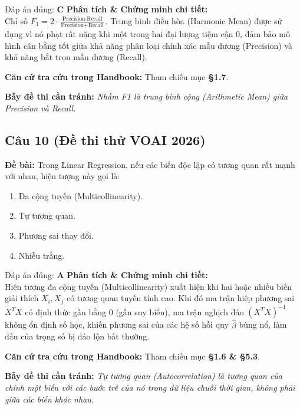 \documentclass[10pt,a4paper]{article}
\begin{document}
\begin{solbox}{Đáp án đúng: \textbf{C}}
\textbf{Phân tích \& Chứng minh chi tiết:} \\
Chỉ số $F_1 = 2 \cdot \frac{\text{Precision} \cdot \text{Recall}}{\text{Precision} + \text{Recall}}$. Trung bình điều hòa (Harmonic Mean) được sử dụng vì nó phạt rất nặng khi một trong hai đại lượng tiệm cận 0, đảm bảo mô hình cân bằng tốt giữa khả năng phân loại chính xác mẫu dương (Precision) và khả năng bắt trọn mẫu dương (Recall).

\vspace{0.4em}
\textbf{Căn cứ tra cứu trong Handbook:} Tham chiếu mục \textbf{§1.7}.

\vspace{0.4em}
\textbf{Bẫy đề thi cần tránh:} \textit{Nhầm F1 là trung bình cộng (Arithmetic Mean) giữa Precision và Recall.}
\end{solbox}
\vspace{0.5em}


\subsection*{Câu 10 (Đề thi thử VOAI 2026)}
\textbf{Đề bài:} Trong Linear Regression, nếu các biến độc lập có tương quan rất mạnh với nhau, hiện tượng này gọi là:

\begin{enumerate}[label=\textbf{\Alph*.}]
    \item Đa cộng tuyến (Multicollinearity).
    \item Tự tương quan.
    \item Phương sai thay đổi.
    \item Nhiễu trắng.
\end{enumerate}

\begin{solbox}{Đáp án đúng: \textbf{A}}
\textbf{Phân tích \& Chứng minh chi tiết:} \\
Hiện tượng đa cộng tuyến (Multicollinearity) xuất hiện khi hai hoặc nhiều biến giải thích $X_i, X_j$ có tương quan tuyến tính cao. Khi đó ma trận hiệp phương sai $X^T X$ có định thức gần bằng 0 (gần suy biến), ma trận nghịch đảo $(X^T X)^{-1}$ không ổn định số học, khiến phương sai của các hệ số hồi quy $\hat{\beta}$ bùng nổ, làm dấu của trọng số bị đảo lộn bất thường.

\vspace{0.4em}
\textbf{Căn cứ tra cứu trong Handbook:} Tham chiếu mục \textbf{§1.6 \& §5.3}.

\vspace{0.4em}
\textbf{Bẫy đề thi cần tránh:} \textit{Tự tương quan (Autocorrelation) là tương quan của chính một biến với các bước trễ của nó trong dữ liệu chuỗi thời gian, không phải giữa các biến khác nhau.}
\end{solbox}
\vspace{0.5em}
\end{document}
